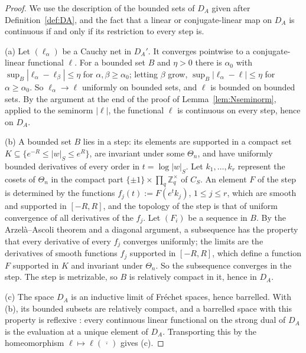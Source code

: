 \documentclass[11pt]{amsart}
\theoremstyle{definition}
\theoremstyle{remark}
\newcommand{\Z}{\mathbb Z}
\newcommand{\DA}{D_A}
\begin{document}
\begin{proof}
We use the description of the bounded sets of $\DA$ given after
Definition~\ref{def:DA}, and the fact that a linear or conjugate-linear map on
$\DA$ is continuous if and only if its restriction to every step is.

(a)  Let $(\ell_{\alpha})$ be a Cauchy net in $\DA'$.  It converges pointwise
to a conjugate-linear functional $\ell$.  For a bounded set $B$ and
$\eta>0$ there is $\alpha_0$ with
$\sup_B|\ell_{\alpha}-\ell_{\beta}|\le\eta$ for
$\alpha,\beta\ge\alpha_0$; letting $\beta$ grow,
$\sup_B|\ell_{\alpha}-\ell|\le\eta$ for $\alpha\ge\alpha_0$.  So
$\ell_{\alpha}\to\ell$ uniformly on bounded sets, and $\ell$ is bounded on
bounded sets.  By the argument at the end of the proof of
Lemma~\ref{lem:Nseminorm}, applied to the seminorm $|\ell|$, the functional
$\ell$ is continuous on every step, hence on $\DA$.

(b)  A bounded set $B$ lies in a step: its elements are supported in a compact
set $K\subseteq\{e^{-R}\le|w|_S\le e^{R}\}$, are invariant under some
$\Theta_n$, and have uniformly bounded derivatives of every order in
$t=\log|w|_S$.  Let $k_1,\dots,k_r$ represent the cosets of $\Theta_n$ in the
compact part $\{\pm1\}\times\prod_q\Z_q^{\times}$ of $C_S$.  An element $F$ of
the step is determined by the functions $f_j(t):=F(e^{t}k_j)$,
$1\le j\le r$, which are smooth and supported in $[-R,R]$, and the topology of
the step is that of uniform convergence of all derivatives of the $f_j$.  Let
$(F_i)$ be a sequence in $B$.  By the Arzel\`a--Ascoli theorem and a diagonal
argument, a subsequence has the property that every derivative of every $f_j$
converges uniformly; the limits are the derivatives of smooth functions $f_j$
supported in $[-R,R]$, which define a function $F$ supported in $K$ and
invariant under $\Theta_n$.  So the subsequence converges in the step.  The
step is metrizable, so $B$ is relatively compact in it, hence in $\DA$.

(c)  The space $\DA$ is an inductive limit of Fr\'echet spaces, hence
barrelled.  With (b), its bounded subsets are relatively compact, and a
barrelled space with this property is reflexive
\cite[Ch.~IV, Theorem~5.6]{Schaefer}: every continuous linear functional on the
strong dual of $\DA$ is the evaluation at a unique element of $\DA$.
Transporting this by the homeomorphism $\ell\mapsto\ell(\overline{\,\cdot\,})$
gives (c).
\end{proof}
\end{document}
